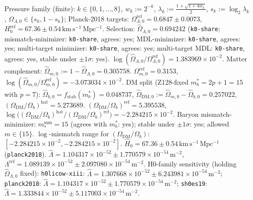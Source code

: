 Pressure family (finite): $k\in\{0,1,\dots,8\}$, $w_k:=2^{-k}$, $\lambda_k:=\frac{1+\sqrt{1+4w_k}}{2}$, $s_k:=\log_2\lambda_k$, $\Omega_{\Lambda,0}\in\{s_k,1-s_k\}$; Planck-2018 targets: $\Omega_{\Lambda,0}^{\mathrm{ref}}=0.6847\pm0.0073$, $H_0^{\mathrm{ref}}=67.36\pm0.54\,\mathrm{km\,s^{-1}\,Mpc^{-1}}$. Selection: $\widehat\Omega_{\Lambda,0}=0.694242$ (\texttt{k0-share}; mismatch-minimizer: \texttt{k0-share}, agrees: yes; MDL-minimizer: \texttt{k0-share}, agrees: yes; multi-target minimizer: \texttt{k0-share}, agrees: yes; multi-target MDL: \texttt{k0-share}, agrees: yes, stable under $\pm1\sigma$: yes). $\log(\widehat\Omega_{\Lambda,0}/\Omega_{\Lambda,0}^{\mathrm{ref}})=1.383969\times 10^{-2}$. Matter complement: $\widehat\Omega_{m,0}:=1-\widehat\Omega_{\Lambda,0}=0.305758$. $\Omega_{m,0}^{\mathrm{ref}}=0.3153$, $\log(\widehat\Omega_{m,0}/\Omega_{m,0}^{\mathrm{ref}})=-3.073034\times 10^{-2}$. DM split (Z128-fixed $m_b^\ast=2p+1=15$ with $p=7$): $\widehat\Omega_{b,0}=f_\mathrm{stab}(m_b^\ast)=0.048737$, $\widehat\Omega_{\mathrm{DM},0}:=\widehat\Omega_{m,0}-\widehat\Omega_{b,0}=0.257022$, $(\Omega_\mathrm{DM}/\Omega_b)^{\mathrm{hat}}=5.273689$. $(\Omega_\mathrm{DM}/\Omega_b)^{\mathrm{ref}}=5.395538$, $\log\bigl((\Omega_\mathrm{DM}/\Omega_b)^{\mathrm{hat}}/(\Omega_\mathrm{DM}/\Omega_b)^{\mathrm{ref}}\bigr)=-2.284215\times 10^{-2}$. Baryon mismatch-minimizer: $m_\ast^{\mathrm{mm}}=15$ (agrees with $m_b^\ast$: yes); stable under $\pm1\sigma$: yes; allowed $m\in\{15\}$. $\log$-mismatch range for $(\Omega_\mathrm{DM}/\Omega_b)$: $[-2.284215\times 10^{-2}, -2.284215\times 10^{-2}]$. $\widehat H_0=67.36\pm0.54\,\mathrm{km\,s^{-1}\,Mpc^{-1}}$ (\texttt{planck2018}). $\widehat\Lambda=1.104317\times 10^{-52}\pm1.770579\times 10^{-54}\,\mathrm{m^{-2}}$, $\Lambda^{\mathrm{ref}}=1.089139\times 10^{-52}\pm2.097080\times 10^{-54}\,\mathrm{m^{-2}}$. H0-family sensitivity (holding $\widehat\Omega_{\Lambda,0}$ fixed): \texttt{h0licow-xiii}: $\widehat\Lambda=1.307668\times 10^{-52}\pm6.243981\times 10^{-54}\,\mathrm{m^{-2}}$; \texttt{planck2018}: $\widehat\Lambda=1.104317\times 10^{-52}\pm1.770579\times 10^{-54}\,\mathrm{m^{-2}}$; \texttt{sh0es19}: $\widehat\Lambda=1.333844\times 10^{-52}\pm5.117003\times 10^{-54}\,\mathrm{m^{-2}}$.
